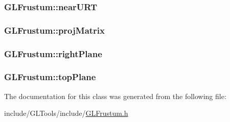 \hypertarget{class_g_l_frustum_a6f67e8ff610896911187d9cc62dadc72}{
\subsubsection[{near\-U\-R\-T}]{ G\-L\-Frustum\-::near\-U\-R\-T\hspace{0.3cm}{\ttfamily [protected]}}}\label{class_g_l_frustum_a6f67e8ff610896911187d9cc62dadc72}
\hypertarget{class_g_l_frustum_a318a8b78ec8c4bb39b44d1068e3d858e}{
\subsubsection[{proj\-Matrix}]{ G\-L\-Frustum\-::proj\-Matrix\hspace{0.3cm}{\ttfamily [protected]}}}\label{class_g_l_frustum_a318a8b78ec8c4bb39b44d1068e3d858e}
\hypertarget{class_g_l_frustum_aefc5ed5e9d4a2914fa0a792a0ccf7aa5}{
\subsubsection[{right\-Plane}]{ G\-L\-Frustum\-::right\-Plane\hspace{0.3cm}{\ttfamily [protected]}}}\label{class_g_l_frustum_aefc5ed5e9d4a2914fa0a792a0ccf7aa5}
\hypertarget{class_g_l_frustum_ad032ad1f7d82e1b66fa4149506b21b78}{
\subsubsection[{top\-Plane}]{ G\-L\-Frustum\-::top\-Plane\hspace{0.3cm}{\ttfamily [protected]}}}\label{class_g_l_frustum_ad032ad1f7d82e1b66fa4149506b21b78}


The documentation for this class was generated from the following file\-:\begin{DoxyCompactItemize}
\item 
include/\-G\-L\-Tools/include/\hyperlink{_g_l_frustum_8h}{G\-L\-Frustum.\-h}\end{DoxyCompactItemize}
